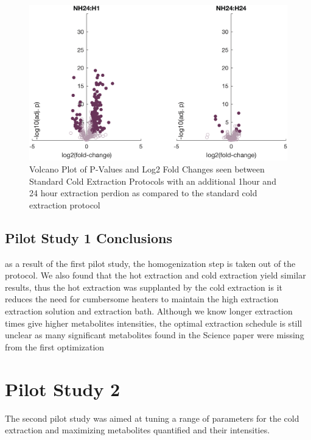 \documentclass[a4paper]{book}
\begin{document}
	\begin{figure}[!htb]
		\centering
		\includegraphics[height=0.3\textheight]{2.Optimizaiton_Figures/NH24}
		\caption{Volcano Plot of P-Values and Log2 Fold Changes seen between Standard Cold Extraction Protocols with an additional 1hour and 24 hour extraction perdion as compared to the standard cold extraction protocol}
		\label{volcano plot: Effect of Homogenization of Metabolite Extraction}
	\end{figure}
	
	\subsection*{Pilot Study 1 Conclusions}
	
	as a result of the first pilot study, the homogenization step is taken out of the protocol. We also found that the hot extraction and cold extraction yield similar results, thus the hot extraction was supplanted by the cold extraction is it reduces the need for cumbersome heaters to maintain the high extraction extraction solution and extraction bath. Although we know longer extraction times give higher metabolites intensities, the optimal extraction schedule is still unclear as many significant metabolites found in the Science paper \citep{Williams2016SystemsFunction} were missing from the first optimization
	
	\newpage
	\section{Pilot Study 2}
	
	The second pilot study was aimed at tuning a range of parameters for the cold extraction and maximizing metabolites quantified and their intensities.
\end{document}
